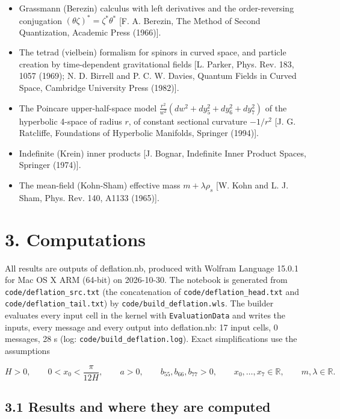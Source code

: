 \documentclass[10pt]{article}
\makeatletter
\newcommand\keepnext{\par\nopagebreak\@nobreaktrue\everypar{\@nobreakfalse\everypar{}}}
\makeatother
\begin{document}
\begin{itemize}
\begin{itemize}
\item Grassmann (Berezin) calculus with left derivatives and the order-reversing conjugation $(\theta\zeta)^* = \zeta^*\theta^*$ [F. A. Berezin, The Method of Second Quantization, Academic Press (1966)].
\item The tetrad (vielbein) formalism for spinors in curved space, and particle creation by time-dependent gravitational fields [L. Parker, Phys. Rev. 183, 1057 (1969); N. D. Birrell and P. C. W. Davies, Quantum Fields in Curved Space, Cambridge University Press (1982)].
\item The Poincare upper-half-space model $\frac{r^2}{w^2}(dw^2 + dy_5^2 + dy_6^2 + dy_7^2)$ of the hyperbolic 4-space of radius $r$, of constant sectional curvature $-1/r^2$ [J. G. Ratcliffe, Foundations of Hyperbolic Manifolds, Springer (1994)].
\item Indefinite (Krein) inner products [J. Bognar, Indefinite Inner Product Spaces, Springer (1974)].
\item The mean-field (Kohn-Sham) effective mass $m + \lambda\rho_s$ [W. Kohn and L. J. Sham, Phys. Rev. 140, A1133 (1965)].
\end{itemize}
\end{itemize}

\section*{3. Computations}

All results are outputs of deflation.nb, produced with Wolfram Language 15.0.1 for Mac OS X ARM (64-bit) on 2026-10-30. The notebook is generated from \texttt{code/deflation\_src.txt} (the concatenation of \texttt{code/deflation\_head.txt} and \texttt{code/deflation\_tail.txt}) by \texttt{code/build\_deflation.wls}. The builder evaluates every input cell in the kernel with \texttt{EvaluationData} and writes the inputs, every message and every output into deflation.nb: 17 input cells, 0 messages, 28 s (log: \texttt{code/build\_deflation.log}). Exact simplifications use the assumptions\keepnext


\[
H > 0, \qquad 0 < x_0 < \frac{\pi}{12H}, \qquad a > 0, \qquad b_{55}, b_{66}, b_{77} > 0, \qquad x_0, \dots, x_7 \in \mathbb R, \qquad m, \lambda \in \mathbb R .
\]

\subsection*{3.1 Results and where they are computed}
\end{document}
